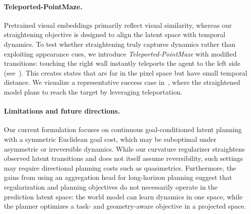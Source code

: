 \vspace{-0.1in}
\paragraph{Teleported-PointMaze.}
Pretrained visual embeddings primarily reflect visual similarity, whereas our straightening objective is designed to align the latent space with temporal dynamics. To test whether straightening truly captures dynamics rather than exploiting appearance cues, we introduce \emph{Teleported-PointMaze} with modified transitions: touching the right wall instantly teleports the agent to the left side (see~). This creates states that are far in the pixel space but have small temporal distance. We visualize a representative success case in~, where the straightened model plans to reach the target by leveraging teleportation. 


\paragraph{Limitations and future directions.}
Our current formulation focuses on continuous goal-conditioned latent planning with a symmetric Euclidean goal cost, which may be suboptimal under asymmetric or irreversible dynamics. While our curvature regularizer straightens observed latent transitions and does not itself assume reversibility, such settings may require directional planning costs such as quasimetrics. Furthermore, the gains from using an aggregation head for long-horizon planning suggest that regularization and planning objectives do not necessarily operate in the prediction latent space: the world model can learn dynamics in one space, while the planner optimizes a task- and geometry-aware objective in a projected space. 



